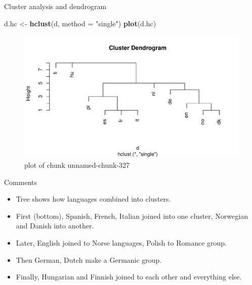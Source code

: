 \documentclass[ignorenonframetext,]{beamer}
\newenvironment{Shaded}{\begin{snugshade}}{\end{snugshade}}
\newcommand{\DataTypeTok}[1]{\textcolor[rgb]{0.13,0.29,0.53}{#1}}
\newcommand{\KeywordTok}[1]{\textcolor[rgb]{0.13,0.29,0.53}{\textbf{#1}}}
\newcommand{\NormalTok}[1]{#1}
\newcommand{\StringTok}[1]{\textcolor[rgb]{0.31,0.60,0.02}{#1}}
\begin{document}
\begin{frame}[fragile]{Cluster analysis and dendrogram}
\protect\hypertarget{cluster-analysis-and-dendrogram}{}

\begin{Shaded}
\begin{Highlighting}[]
\NormalTok{d.hc <-}\StringTok{ }\KeywordTok{hclust}\NormalTok{(d, }\DataTypeTok{method =} \StringTok{"single"}\NormalTok{)}
\KeywordTok{plot}\NormalTok{(d.hc)}
\end{Highlighting}
\end{Shaded}

\begin{figure}
\centering
\includegraphics{figure/unnamed-chunk-327-1.pdf}
\caption{plot of chunk unnamed-chunk-327}
\end{figure}

\end{frame}

\begin{frame}{Comments}
\protect\hypertarget{comments-17}{}

\begin{itemize}
\item
  Tree shows how languages combined into clusters.
\item
  First (bottom), Spanish, French, Italian joined into one cluster,
  Norwegian and Danish into another.
\item
  Later, English joined to Norse languages, Polish to Romance group.
\item
  Then German, Dutch make a Germanic group.
\item
  Finally, Hungarian and Finnish joined to each other and everything
  else.
\end{itemize}

\end{frame}
\end{document}
